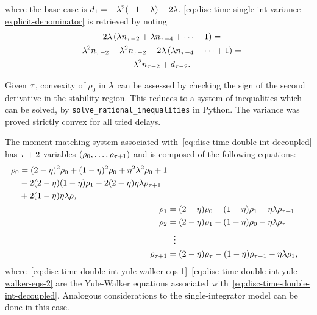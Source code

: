 where the base case is $ d_1 = -\lambda^2(-1-\lambda)-2\lambda $.
\cref{eq:disc-time-single-int-variance-explicit-denominator} is retrieved by noting
\begin{multline}\label{eq:denominator-recursirve-1}
	-2\lambda\left(\lambda n_{\tau-2} + \lambda n_{\tau-4} + \dots + 1\right) = \\
	-\lambda^2 n_{\tau-2} -\lambda^2 n_{\tau-2} - 2\lambda\left(\lambda n_{\tau-4} + \dots + 1\right) = \\
	-\lambda^2 n_{\tau-2} + d_{\tau-2}.
\end{multline}

Given $ \tau $,
convexity of $ \rho_0 $ in $ \lambda $ can be assessed by checking the sign
of the second derivative in the stability region.
This reduces to a system of inequalities
which can be solved, \eg by \texttt{solve\_rational\_inequalities} in Python.
The variance was proved strictly convex for all tried delays.

The moment-matching system associated with~\eqref{eq:disc-time-double-int-decoupled}
has $ \tau+2 $ variables $ (\rho_0,\dots,\rho_{\tau+1}) $ and is composed of the following equations:
\begin{subequations}\label{eq:disc-time-double-int-moment-matching-eqs}
	\begin{align}
		\begin{split}
			\rho_0 &= (2-\eta)^2\rho_0 + (1-\eta)^2\rho_0 + \eta^2\lambda^2\rho_0 + 1 \\
			&- 2(2-\eta)(1-\eta)\rho_1 - 2(2-\eta)\eta\lambda\rho_{\tau+1} \\
			&+ 2(1-\eta)\eta\lambda\rho_\tau
			\label{eq:disc-time-double-int-first-moment-eq}
		\end{split}\\
		\rho_1 &= (2-\eta)\rho_0 - (1-\eta)\rho_1 - \eta\lambda\rho_{\tau+1} \label{eq:disc-time-double-int-yule-walker-eqs-1}\\
		\rho_2 &= (2-\eta)\rho_1 - (1-\eta)\rho_0 - \eta\lambda\rho_{\tau}\\
		&\hspace{2mm}\vdots \nonumber \\
		\rho_{\tau+1} &= (2-\eta)\rho_\tau - (1-\eta)\rho_{\tau-1} - \eta\lambda\rho_1, \label{eq:disc-time-double-int-yule-walker-eqs-2}
	\end{align}
\end{subequations}
where~\eqref{eq:disc-time-double-int-yule-walker-eqs-1}--\eqref{eq:disc-time-double-int-yule-walker-eqs-2} are the Yule-Walker equations
associated with~\eqref{eq:disc-time-double-int-decoupled}.
Analogous considerations to the single-integrator model can be done in this case.